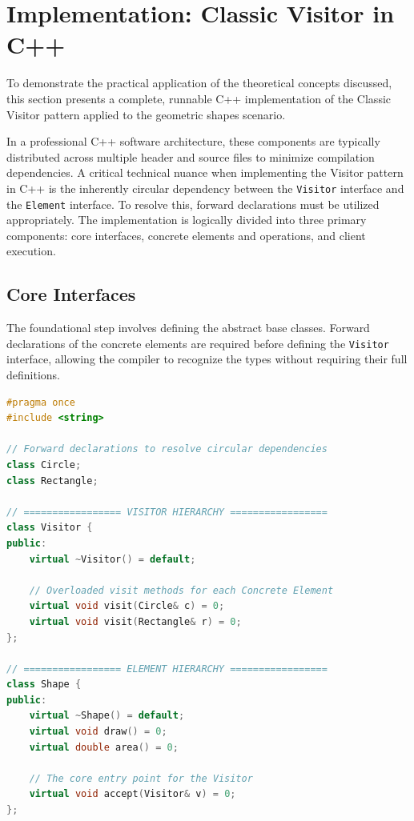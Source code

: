 \section{Implementation: Classic Visitor in C++}
\label{sec:implementation}

To demonstrate the practical application of the theoretical concepts discussed, this section presents a complete, runnable C++ implementation of the Classic Visitor pattern applied to the geometric shapes scenario. 

In a professional C++ software architecture, these components are typically distributed across multiple header and source files to minimize compilation dependencies. A critical technical nuance when implementing the Visitor pattern in C++ is the inherently circular dependency between the \texttt{Visitor} interface and the \texttt{Element} interface. To resolve this, forward declarations must be utilized appropriately. The implementation is logically divided into three primary components: core interfaces, concrete elements and operations, and client execution.

\subsection{Core Interfaces}
The foundational step involves defining the abstract base classes. Forward declarations of the concrete elements are required before defining the \texttt{Visitor} interface, allowing the compiler to recognize the types without requiring their full definitions.

\begin{lstlisting}[language=C++, caption=Core Interfaces (typically \texttt{Visitor.h} and \texttt{Shape.h})]
#pragma once
#include <string>

// Forward declarations to resolve circular dependencies
class Circle;
class Rectangle;

// ================= VISITOR HIERARCHY =================
class Visitor {
public:
    virtual ~Visitor() = default;
    
    // Overloaded visit methods for each Concrete Element
    virtual void visit(Circle& c) = 0;
    virtual void visit(Rectangle& r) = 0;
};

// ================= ELEMENT HIERARCHY =================
class Shape {
public:
    virtual ~Shape() = default;
    virtual void draw() = 0;
    virtual double area() = 0;
    
    // The core entry point for the Visitor
    virtual void accept(Visitor& v) = 0;
};
\end{lstlisting}

